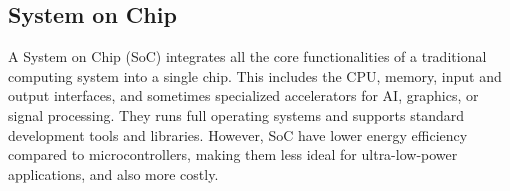 \subsection{System on Chip}
A System on Chip (SoC) integrates all the core functionalities of a traditional computing system into a single chip.
This includes the CPU, memory, input and output interfaces, and sometimes specialized accelerators for AI, graphics, or signal processing.
They runs full operating systems and supports standard development tools and libraries. 
However, SoC have lower energy efficiency compared to microcontrollers, making them less ideal for ultra-low-power applications, and also more costly.